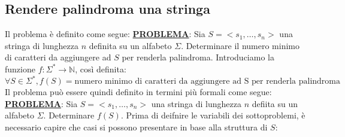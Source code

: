 \documentclass[12pt]{article}
\begin{document}
\subsection{Rendere palindroma una stringa}
Il problema è definito come segue: \newline
\textbf{\underline{PROBLEMA}}: Sia $S = <s_1, \dots, s_n>$ una stringa di lunghezza $n$ definita su un alfabeto $\Sigma$. Determinare il numero minimo di caratteri da aggiungere ad $S$ per renderla palindroma.
Introduciamo la funzione $f: \Sigma^* \rightarrow \mathbb{N}$, così definita:
$$\forall S \in \Sigma^*, f(S) = \textrm{numero minimo di caratteri da aggiungere ad S per renderla palindroma}$$
Il problema può essere quindi definito in termini più formali come segue: \newline
\textbf{\underline{PROBLEMA}}: Sia $S = <s_1, \dots, s_n>$ una stringa di lunghezza $n$ defiita su un alfabeto $\Sigma$. Determinare $f(S)$. \newline
Prima di deifnire le variabili dei sottoproblemi, è necessario capire che casi si possono presentare in base alla struttura di $S$:
\end{document}
